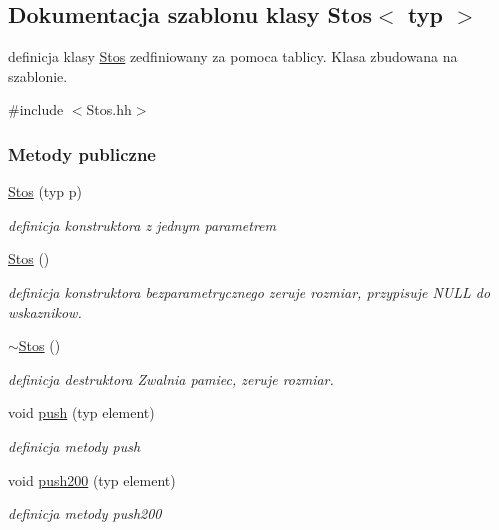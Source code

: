 \hypertarget{class_stos}{}\subsection{Dokumentacja szablonu klasy Stos$<$ typ $>$}
\label{class_stos}


definicja klasy \hyperlink{class_stos}{Stos} zedfiniowany za pomoca tablicy. Klasa zbudowana na szablonie.  




{\ttfamily \#include $<$Stos.\+hh$>$}

\subsubsection*{Metody publiczne}
\begin{DoxyCompactItemize}
\item 
\hyperlink{class_stos_af6c53f2458ebd95fd992a14fef6712d0}{Stos} (typ p)
\begin{DoxyCompactList}\small\item\em definicja konstruktora z jednym parametrem \end{DoxyCompactList}\item 
\hyperlink{class_stos_afc525fb8a9f8f80fda9bf0f846c078c4}{Stos} ()
\begin{DoxyCompactList}\small\item\em definicja konstruktora bezparametrycznego zeruje rozmiar, przypisuje N\+U\+L\+L do wskaznikow. \end{DoxyCompactList}\item 
\hyperlink{class_stos_a1e9ba3ec6f2759c1fd9a69b56b0d0c5f}{$\sim$\+Stos} ()
\begin{DoxyCompactList}\small\item\em definicja destruktora Zwalnia pamiec, zeruje rozmiar. \end{DoxyCompactList}\item 
void \hyperlink{class_stos_a51e06002fe60a5946cb2dd82cd0c0e06}{push} (typ element)
\begin{DoxyCompactList}\small\item\em definicja metody push \end{DoxyCompactList}\item 
void \hyperlink{class_stos_a7d2b9f064f122a2970f3ca4d28af42cd}{push200} (typ element)
\begin{DoxyCompactList}\small\item\em definicja metody push200 \end{DoxyCompactList}\item 

\end{DoxyCompactItemize}
